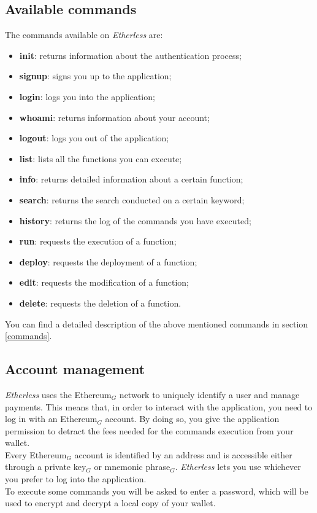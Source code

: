 \subsection{Available commands}
\noindent The commands available on \textit{Etherless} are:
\begin{itemize}
	\item \textbf{init}: returns information about the authentication process;
	\item \textbf{signup}: signs you up to the application;
	\item \textbf{login}: logs you into the application;
	\item \textbf{whoami}: returns information about your account;
	\item \textbf{logout}: logs you out of the application;
	\item \textbf{list}: lists all the functions you can execute;
	\item \textbf{info}: returns detailed information about a certain function;
	\item \textbf{search}: returns the search conducted on a certain keyword;
	\item \textbf{history}: returns the log of the commands you have executed;
	\item \textbf{run}: requests the execution of a function;
	\item \textbf{deploy}: requests the deployment of a function;
	\item \textbf{edit}: requests the modification of a function;
	\item \textbf{delete}: requests the deletion of a function.
\end{itemize}
You can find a detailed description of the above mentioned commands in section \ref{commands}.

\subsection{Account management}
\textit{Etherless} uses the Ethereum$_{G}$ network to uniquely identify a user and manage payments. This means that, in order to interact with the application, you need to log in with an Ethereum$_{G}$ account. By doing so, you give the application permission to detract the fees needed for the commands execution from your wallet. \\
Every Ethereum$_{G}$ account is identified by an address and is accessible either through a private key$_{G}$ or mnemonic phrase$_{G}$. \textit{Etherless} lets you use whichever you prefer to log into the application. \\
To execute some commands you will be asked to enter a password, which will be used to encrypt and decrypt a local copy of your wallet.

